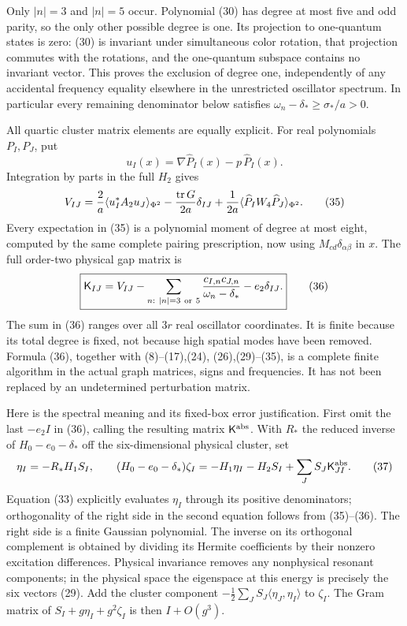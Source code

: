 \documentclass[
  11pt,
]{article}
\begin{document}
Only \(|n|=3\) and \(|n|=5\) occur. Polynomial (30) has degree at most
five and odd parity, so the only other possible degree is one. Its
projection to one-quantum states is zero: (30) is invariant under
simultaneous color rotation, that projection commutes with the
rotations, and the one-quantum subspace contains no invariant vector.
This proves the exclusion of degree one, independently of any accidental
frequency equality elsewhere in the unrestricted oscillator spectrum. In
particular every remaining denominator below satisfies
\(\omega_n-\delta_*\ge\sigma_*/a>0\).

All quartic cluster matrix elements are equally explicit. For real
polynomials \(P_I,P_J\), put \[
 u_I(x)=\nabla\widehat P_I(x)-p\,\widehat P_I(x).
 \tag{34}
\] Integration by parts in the full \(H_2\) gives \[
 V_{IJ}={2\over a}\langle u_I^*A_2u_J\rangle_{\Phi^2}
       -{\operatorname{tr}G\over2a}\delta_{IJ}
       +{1\over2a}\langle\widehat P_I W_4\widehat P_J\rangle_{\Phi^2}.
 \tag{35}
\] Every expectation in (35) is a polynomial moment of degree at most
eight, computed by the same complete pairing prescription, now using
\(M_{cd}\delta_{\alpha\beta}\) in \(x\). The full order-two physical gap
matrix is \[
 \boxed{\mathsf K_{IJ}=
 V_{IJ}-\sum_{\substack{n:\ |n|=3\ {\rm or}\ 5}}
              {c_{I,n}c_{J,n}\over\omega_n-\delta_*}
                                      -e_2\delta_{IJ}.}
 \tag{36}
\] The sum in (36) ranges over all \(3r\) real oscillator coordinates.
It is finite because its total degree is fixed, not because high spatial
modes have been removed. Formula (36), together with (8)--(17),(24),
(26),(29)--(35), is a complete finite algorithm in the actual graph
matrices, signs and frequencies. It has not been replaced by an
undetermined perturbation matrix.

Here is the spectral meaning and its fixed-box error justification.
First omit the last \(-e_2I\) in (36), calling the resulting matrix
\(\mathsf K^{\rm abs}\). With \(R_*\) the reduced inverse of
\(H_0-e_0-\delta_*\) off the six-dimensional physical cluster, set \[
 \eta_I=-R_*H_1S_I,\qquad
 (H_0-e_0-\delta_*)\zeta_I
 =-H_1\eta_I-H_2S_I+\sum_JS_J\mathsf K^{\rm abs}_{JI}.
 \tag{37}
\] Equation (33) explicitly evaluates \(\eta_I\) through its positive
denominators; orthogonality of the right side in the second equation
follows from (35)--(36). The right side is a finite Gaussian polynomial.
The inverse on its orthogonal complement is obtained by dividing its
Hermite coefficients by their nonzero excitation differences. Physical
invariance removes any nonphysical resonant components; in the physical
space the eigenspace at this energy is precisely the six vectors (29).
Add the cluster component
\(-\tfrac12\sum_JS_J\langle\eta_J,\eta_I\rangle\) to \(\zeta_I\). The
Gram matrix of \(S_I+g\eta_I+g^2\zeta_I\) is then \(I+O(g^3)\).
\end{document}
